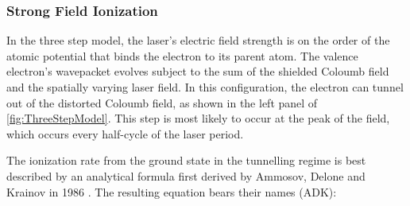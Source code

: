 \subsubsection{Strong Field Ionization}

In the three step model, the laser's electric field strength is on the order of the atomic potential that binds the electron to its parent atom. The valence electron's wavepacket evolves subject to the sum of the shielded Coloumb field and the spatially varying laser field. In this configuration, the electron can tunnel out of the distorted Coloumb field, as shown in the left panel of \cref{fig:ThreeStepModel}. This step is most likely to occur at the peak of the field, which occurs every half-cycle of the laser period.

The ionization rate from the ground state in the tunnelling regime is best described by an analytical formula first derived by Ammosov, Delone and Krainov in 1986 \cite{ammosovTunnelIonizationComplex1986,changFundamentalsAttosecondOptics2011,laiExperimentalInvestigationStrongfieldionization2017}. The resulting equation bears their names (ADK):



